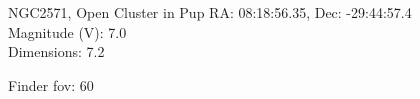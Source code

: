 \begin{block}{NGC2571, Open Cluster in Pup}
    RA: 08:18:56.35, Dec: -29:44:57.4 \\ 
    Magnitude (V): 7.0 \\ 
    Dimensions: 7.2 

    Finder fov: 60 

     
\end{block}